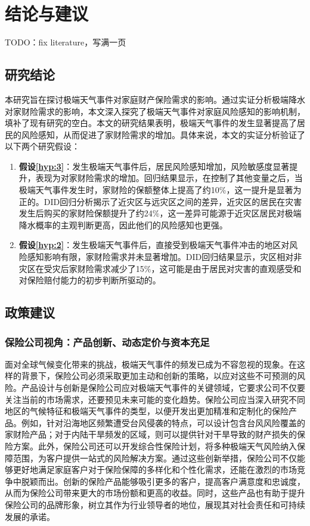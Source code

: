 \chapter{结论与建议}\label{chap:5}
TODO：fix literature，写满一页

\section{研究结论}
本研究旨在探讨极端天气事件对家庭财产保险需求的影响。通过实证分析极端降水对家财险需求的影响，本文深入探究了极端天气事件对家庭风险感知的影响机制，填补了现有研究的空白。本文的研究结果表明，极端天气事件的发生显著提高了居民的风险感知，从而促进了家财险需求的增加。具体来说，本文的实证分析验证了以下两个研究假设：

\begin{enumerate}
    \item \textbf{假设\ref{hyp:3}}：发生极端天气事件后，居民风险感知增加，风险敏感度显著提升，表现为对家财险需求的增加。回归结果显示，在控制了其他变量之后，当极端天气事件发生时，家财险的保额整体上提高了约10\%，这一提升是显著为正的。DID回归分析揭示了近灾区与远灾区之间的差异，近灾区的居民在灾害发生后购买的家财险保额提升了约24\%，这一差异可能源于近灾区居民对极端降水概率的主观判断更高，因此他们的风险感知也更强。
    \item \textbf{假设\ref{hyp:2}}：发生极端天气事件后，直接受到极端天气事件冲击的地区对风险感知影响有限，家财险需求并未显著增加。DID回归结果显示，灾区相对非灾区在受灾后家财险需求减少了15\%，这可能是由于居民对灾害的直观感受和对保险赔付能力的初步判断所驱动的。
\end{enumerate}

\section{政策建议}
\subsection{保险公司视角：产品创新、动态定价与资本充足}
面对全球气候变化带来的挑战，极端天气事件的频发已成为不容忽视的现象。在这样的背景下，保险公司必须采取更加主动和创新的策略，以应对这些不可预测的风险。产品设计与创新是保险公司应对极端天气事件的关键领域，它要求公司不仅要关注当前的市场需求，还要预见未来可能的变化趋势。保险公司应当深入研究不同地区的气候特征和极端天气事件的类型，以便开发出更加精准和定制化的保险产品。例如，针对沿海地区频繁遭受台风侵袭的特点，可以设计包含台风风险覆盖的家财险产品；对于内陆干旱频发的区域，则可以提供针对干旱导致的财产损失的保险方案。此外，保险公司还可以开发综合性保险计划，将多种极端天气风险纳入保障范围，为客户提供一站式的风险解决方案。通过这些创新举措，保险公司不仅能够更好地满足家庭客户对于保险保障的多样化和个性化需求，还能在激烈的市场竞争中脱颖而出。创新的保险产品能够吸引更多的客户，提高客户满意度和忠诚度，从而为保险公司带来更大的市场份额和更高的收益。同时，这些产品也有助于提升保险公司的品牌形象，树立其作为行业领导者的地位，展现其对社会责任和可持续发展的承诺。

